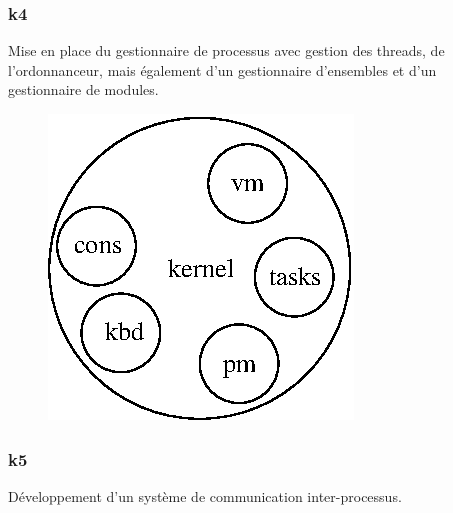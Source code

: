 \documentclass[10pt,a4wide]{article}
\begin{document}
\newpage

\subsubsection{k4}

Mise en place du gestionnaire de processus avec gestion des threads, de
l'ordonnanceur, mais \'egalement d'un gestionnaire d'ensembles et
d'un gestionnaire de modules.

\vspace{5cm}

\begin{figure}[h]
\centerline{\includegraphics{figures/k4.eps}}
\end{figure}

\newpage

\subsubsection{k5}

D\'eveloppement d'un syst\`eme de communication inter-processus.

\vspace{5cm}
\end{document}
